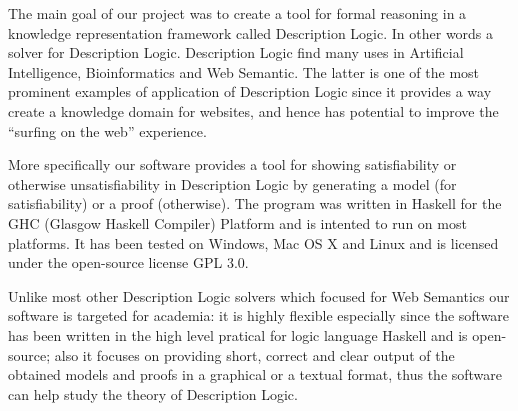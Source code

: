 
The main goal of our project was to create a tool for formal reasoning
in a knowledge representation framework called Description Logic. In
other words a solver for Description Logic. Description Logic find
many uses in Artificial Intelligence, Bioinformatics and Web
Semantic. The latter is one of the most prominent examples of
application of Description Logic since it provides a way create a
knowledge domain for websites, and hence has potential to improve
the ``surfing on the web'' experience.

More specifically our software provides a tool for showing
satisfiability or otherwise unsatisfiability in Description Logic by
generating a model (for satisfiability) or a proof (otherwise). The
program was written in Haskell for the GHC (Glasgow Haskell Compiler)
Platform and is intented to run on most platforms. It has been tested
on Windows, Mac OS X and Linux and is licensed under the open-source
license GPL 3.0.

Unlike most other Description Logic solvers which focused for Web Semantics
 our software is targeted for academia: it is highly flexible
especially since the software has been written in the high level
pratical for logic language Haskell and is open-source; also it
focuses on providing short, correct and clear output of the obtained
models and proofs in a graphical or a textual format, thus the
software can help study the theory of Description Logic.

